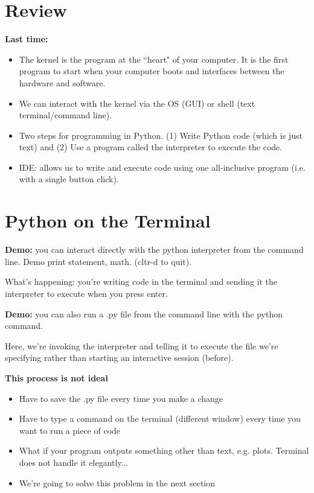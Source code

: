 \documentclass[12pt]{article}
\numberwithin{equation}{section}
\begin{document}
\section{Review}


\textbf{Last time:}
\begin{itemize}
    \item The kernel is the program at the ``heart" of your computer. It is the first program to start when your computer boots and interfaces between the hardware and software.
    \item We can interact with the kernel via the OS (GUI) or shell (text terminal/command line).
    \item Two steps for programming in Python. (1) Write Python code (which is just text) and (2) Use a program called the interpreter to execute the code.
    \item IDE: allows us to write and execute code using one all-inclusive program (i.e. with a single button click).
\end{itemize}

\section{Python on the Terminal}
\textbf{Demo:} you can interact directly with the python interpreter from the command line. Demo print statement, math. (cltr-d to quit).

What's happening: you're writing code in the terminal and sending it the interpreter to execute when you press enter.

\textbf{Demo:} you can also run a .py file from the command line with the python command. 

Here, we're invoking the interpreter and telling it to execute the file we're specifying rather than starting an interactive session (before).

\textbf{This process is not ideal}

\begin{itemize}
    \item Have to save the .py file every time you make a change
    \item Have to type a command on the terminal (different window) every time you want to run a piece of code
    \item What if your program outputs something other than text, e.g. plots. Terminal does not handle it elegantly...
    \item We're going to solve this problem in the next section
\end{itemize}
\end{document}
